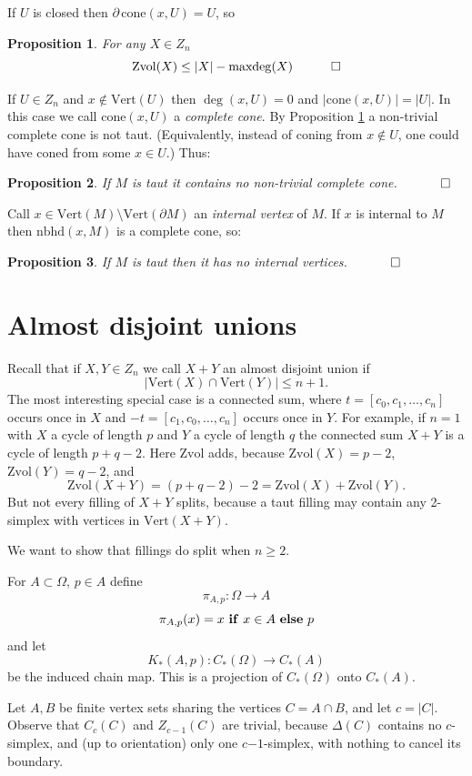 \documentclass[12pt]{article}
\newtheorem{prop}{Proposition}
\newcommand{\mathproofend}{\quad \qed}
\newcommand{\proofend}{$\quad \qed$}
\def\del{\partial}
\newcommand{\kw}{\mathrm}
\newcommand{\cone}{\kw{cone}}
\newcommand{\maxdeg}{\kw{maxdeg}}
\newcommand{\vertices}{\kw{Vert}}
\newcommand{\nbhd}{\kw{nbhd}}
\newcommand{\Zvol}{\kw{Zvol}}
\newcommand{\kwstyle}{\bf}
\newcommand{\IF}{{\ \kwstyle{if}\ }}
\newcommand{\ELSE}{{\ \kwstyle{else}\ }}
\newcommand{\mns}{\mathord{-}}
\begin{document}
If $U$ is closed then
$\del\, \cone(x,U) = U$, so

\begin{prop} \label{maxdeg}
For any $X \in Z_n$
\[
\Zvol(X) \leq |X| - \maxdeg(X)
\mathproofend
\]
\end{prop}

If $U \in Z_n$ and $x \notin \vertices(U)$ then
$\deg(x,U)=0$ and
$|\cone(x,U)| = |U|$.
In this case we call $\cone(x,U)$ a \emph{complete cone}.
By Proposition \ref{maxdeg} a non-trivial complete cone is not taut.
(Equivalently, instead of coning from
$x \notin U$, one could have coned from some $x \in U$.)
Thus:
\begin{prop}\label{nocone}
If $M$ is taut it contains no non-trivial complete cone.
\proofend
\end{prop}

Call $x \in \vertices(M) \setminus \vertices(\del M)$ an
\emph{internal vertex} of $M$.
If $x$ is internal to $M$ then $\nbhd(x,M)$ is a complete cone, so:
\begin{prop} \label{nointernal}
If $M$ is taut then
it has no internal vertices.
\proofend
\end{prop}

\section{Almost disjoint unions}

Recall that if $X,Y \in Z_n$ we call $X+Y$ an almost disjoint union
if
\[
|\vertices(X) \cap \vertices(Y)| \leq n+1
.\]
The most interesting special case is a connected sum,
where $t=[c_0,c_1,\ldots,c_n]$ occurs once in $X$ and
$-t=[c_1,c_0,\ldots,c_n]$ occurs once in $Y$.
For example, if $n=1$ with $X$ a cycle of length $p$
and $Y$ a cycle of length $q$
the connected sum $X+Y$ is
a cycle of length $p+q-2$.
Here
$\Zvol$ adds, because
$\Zvol(X)=p-2$,
$\Zvol(Y) = q-2$,
and
\[
\Zvol(X+Y) = (p+q-2)-2 = \Zvol(X)+\Zvol(Y)
.
\]
But not every filling of $X+Y$ splits, because a taut filling
may contain any 2-simplex with vertices in $\vertices(X+Y)$.

We want to show that fillings do split when $n \geq 2$.

For $A \subset \Omega$, $p \in A$ define
\[
\pi_{A,p}: \Omega \to A
\]
\[
\pi_{A,p}(x) = x \IF x \in A \ELSE p
\]
and let
\[
K_*(A,p): C_*(\Omega) \to C_*(A)
\]
be the induced chain map.
This is a projection of $C_*(\Omega)$ onto $C_*(A)$.

Let $A,B$ be finite vertex sets sharing the vertices
$C = A \cap B$,
and let $c=|C|$.
Observe that
$C_c(C)$ and $Z_{c-1}(C)$ are trivial,
because $\Delta(C)$ contains no $c$-simplex,
and (up to orientation) only one $c\mns 1$-simplex,
with nothing to cancel its boundary.
\end{document}
